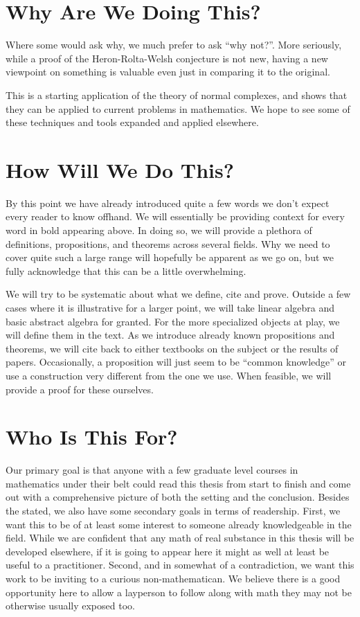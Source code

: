 \documentclass[12pt,oneside]{../../sfsuthesis}
\begin{document}
\section{Why Are We Doing This?}

Where some would ask why, we much prefer to ask ``why not?''.
More seriously, while a proof of the Heron-Rolta-Welsh conjecture is not new, having a new viewpoint on something is valuable even just in comparing it to the original.

This is a starting application of the theory of normal complexes, and shows that they can be applied to current problems in mathematics.
We hope to see some of these techniques and tools expanded and applied elsewhere.

\section{How Will We Do This?}

By this point we have already introduced quite a few words we don't expect every reader to know offhand.
We will essentially be providing context for every word in bold appearing above.
In doing so, we will provide a plethora of definitions, propositions, and theorems across several fields.
Why we need to cover quite such a large range will hopefully be apparent as we go on, but we fully acknowledge that this can be a little overwhelming.

We will try to be systematic about what we define, cite and prove.
Outside a few cases where it is illustrative for a larger point, we will take linear algebra and basic abstract algebra for granted.
For the more specialized objects at play, we will define them in the text.
As we introduce already known propositions and theorems, we will cite back to either textbooks on the subject or the results of papers.
Occasionally, a proposition will just seem to be ``common knowledge'' or use a construction very different from the one we use.
When feasible, we will provide a proof for these ourselves.

\section{Who Is This For?}

Our primary goal is that anyone with a few graduate level courses in mathematics under their belt could read this thesis from start to finish and come out with a comprehensive picture of both the setting and the conclusion.
Besides the stated, we also have some secondary goals in terms of readership.
First, we want this to be of at least some interest to someone already knowledgeable in the field.
While we are confident that any math of real substance in this thesis will be developed elsewhere, if it is going to appear here it might as well at least be useful to a practitioner.
Second, and in somewhat of a contradiction, we want this work to be inviting to a curious non-mathematican.
We believe there is a good opportunity here to allow a layperson to follow along with math they may not be otherwise usually exposed too.
\end{document}
